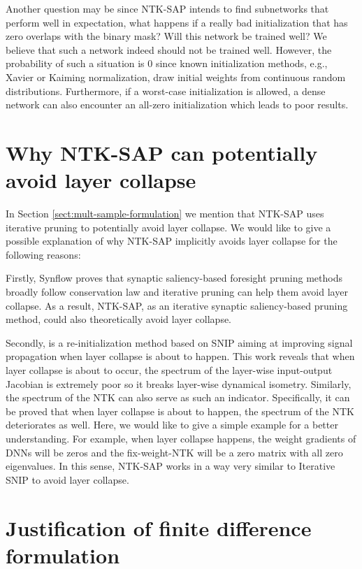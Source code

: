 \documentclass{article} %
\begin{document}
Another question may be since NTK-SAP intends to find subnetworks that perform well in expectation, what happens if a really bad initialization that has zero overlaps with the binary mask? Will this network be trained well? We believe that such a network indeed should not be trained well. However, the probability of such a situation is 0 since known initialization methods, e.g., Xavier or Kaiming normalization, draw initial weights from continuous random distributions. Furthermore, if a worst-case initialization is allowed, a dense network can also encounter an all-zero initialization which leads to poor results.

\section{Why NTK-SAP can potentially avoid layer collapse} \label{sect:layer-collapse}
In Section \ref{sect:mult-sample-formulation} we mention that NTK-SAP uses iterative pruning to potentially avoid layer collapse. We would like to give a possible explanation of why NTK-SAP implicitly avoids layer collapse for the following reasons:

Firstly, Synflow \citep{synflow} proves that synaptic saliency-based foresight pruning methods broadly follow conservation law and iterative pruning can help them avoid layer collapse. As a result, NTK-SAP, as an iterative synaptic saliency-based pruning method, could also theoretically avoid layer collapse.

Secondly, \citet{lee2019signal} is a re-initialization method based on SNIP aiming at improving signal propagation when layer collapse is about to happen. This work reveals that when layer collapse is about to occur, the spectrum of the layer-wise input-output Jacobian is extremely poor so it breaks layer-wise dynamical isometry. Similarly, the spectrum of the NTK can also serve as such an indicator. Specifically, it can be proved that when layer collapse is about to happen, the spectrum of the NTK deteriorates as well. Here, we would like to give a simple example for a better understanding. For example, when layer collapse happens, the weight gradients of DNNs will be zeros and the fix-weight-NTK will be a zero matrix with all zero eigenvalues. In this sense, NTK-SAP works in a way very similar to Iterative SNIP \citep{force} to avoid layer collapse.

\section{Justification of finite difference formulation} \label{sect:justification}
\end{document}
